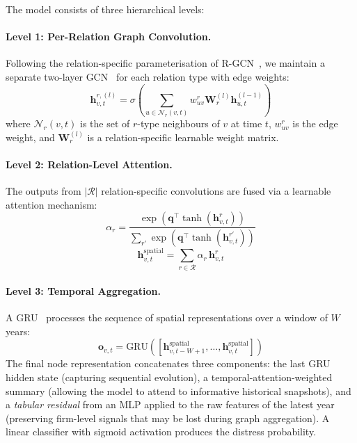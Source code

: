 \documentclass[3p,times,procedia]{elsarticle}
\begin{document}
The model consists of three hierarchical levels:

\paragraph{Level 1: Per-Relation Graph Convolution.}
Following the relation-specific parameterisation of R-GCN~\cite{schlichtkrull2018modeling}, we maintain a separate two-layer GCN~\cite{kipf2017semi} for each relation type with edge weights:
\begin{equation}
\mathbf{h}_{v,t}^{r,(l)} = \sigma\!\left(\sum_{u \in \mathcal{N}_r(v,t)} w_{uv}^r \mathbf{W}_r^{(l)} \mathbf{h}_{u,t}^{(l-1)} \right)
\end{equation}
where $\mathcal{N}_r(v,t)$ is the set of $r$-type neighbours of $v$ at time $t$, $w_{uv}^r$ is the edge weight, and $\mathbf{W}_r^{(l)}$ is a relation-specific learnable weight matrix.

\paragraph{Level 2: Relation-Level Attention.}
The outputs from $|\mathcal{R}|$ relation-specific convolutions are fused via a learnable attention mechanism:
\begin{equation}
\alpha_r = \frac{\exp(\mathbf{q}^\top \tanh(\mathbf{h}_{v,t}^r))}{\sum_{r'} \exp(\mathbf{q}^\top \tanh(\mathbf{h}_{v,t}^{r'}))}
\end{equation}
\begin{equation}
\mathbf{h}_{v,t}^{\text{spatial}} = \sum_{r \in \mathcal{R}} \alpha_r \, \mathbf{h}_{v,t}^r
\end{equation}

\paragraph{Level 3: Temporal Aggregation.}
A GRU~\cite{cho2014learning} processes the sequence of spatial representations over a window of $W$ years:
\begin{equation}
\mathbf{o}_{v,t} = \text{GRU}([\mathbf{h}_{v,t-W+1}^{\text{spatial}}, \ldots, \mathbf{h}_{v,t}^{\text{spatial}}])
\end{equation}
The final node representation concatenates three components: the last GRU hidden state (capturing sequential evolution), a temporal-attention-weighted summary (allowing the model to attend to informative historical snapshots), and a \emph{tabular residual} from an MLP applied to the raw features of the latest year (preserving firm-level signals that may be lost during graph aggregation).
A linear classifier with sigmoid activation produces the distress probability.
\end{document}
